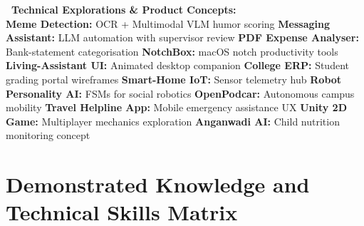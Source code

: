 \documentclass[10pt,a4paper]{article}
\begin{document}
\begin{tcolorbox}[enhanced, colback=lightbg, colframe=cardborder, boxrule=0.4pt, arc=3pt, left=8pt, right=8pt, top=4pt, bottom=4pt]
  {\scriptsize\bfseries\color{primary}\ Technical Explorations \& Product Concepts:}\\[2pt]
  {\tiny\color{textdark}
  \textbf{Meme Detection:} OCR + Multimodal VLM humor scoring \quad\textbar\quad
  \textbf{Messaging Assistant:} LLM automation with supervisor review \quad\textbar\quad
  \textbf{PDF Expense Analyser:} Bank-statement categorisation \quad\textbar\quad
  \textbf{NotchBox:} macOS notch productivity tools \quad\textbar\quad
  \textbf{Living-Assistant UI:} Animated desktop companion \quad\textbar\quad
  \textbf{College ERP:} Student grading portal wireframes \quad\textbar\quad
  \textbf{Smart-Home IoT:} Sensor telemetry hub \quad\textbar\quad
  \textbf{Robot Personality AI:} FSMs for social robotics \quad\textbar\quad
  \textbf{OpenPodcar:} Autonomous campus mobility \quad\textbar\quad
  \textbf{Travel Helpline App:} Mobile emergency assistance UX \quad\textbar\quad
  \textbf{Unity 2D Game:} Multiplayer mechanics exploration \quad\textbar\quad
  \textbf{Anganwadi AI:} Child nutrition monitoring concept
  }
\end{tcolorbox}

\newpage

\section{Demonstrated Knowledge and Technical Skills Matrix}
\end{document}
